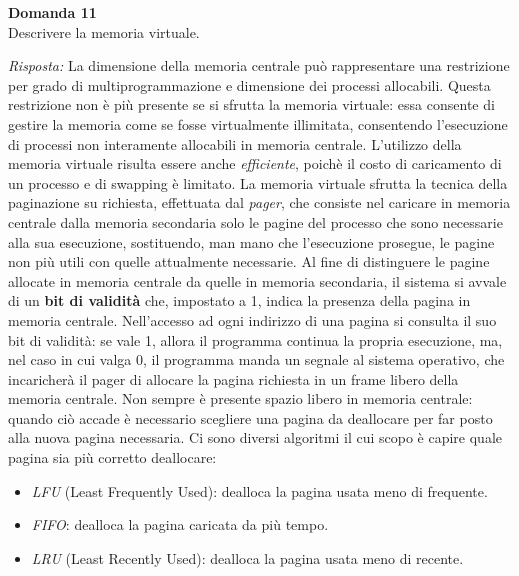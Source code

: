 \documentclass{article}
\newenvironment{problem}[2][Domanda]
    { \begin{mdframed}[backgroundcolor=gray!20] \textbf{#1 #2} \\}
    {  \end{mdframed}}
\newenvironment{solution}
    {\textit{Risposta:}}
    {}
\begin{document}
\begin{problem}{11}
Descrivere la memoria virtuale.
\end{problem}
\begin{solution}
La dimensione della memoria centrale può rappresentare una restrizione per grado di multiprogrammazione e dimensione dei processi allocabili.
Questa restrizione non è più presente se si sfrutta la memoria virtuale: essa consente di gestire la memoria come se fosse virtualmente illimitata, consentendo l’esecuzione di processi non interamente allocabili in memoria centrale.
L’utilizzo della memoria virtuale risulta essere anche \textit{efficiente}, poichè il costo di caricamento di un processo e di swapping è limitato.
\newline
\newline
La memoria virtuale sfrutta la tecnica della paginazione su richiesta, effettuata dal \textit{pager}, che consiste nel caricare in memoria centrale dalla memoria secondaria solo le pagine del processo che sono necessarie alla sua esecuzione, sostituendo, man mano che l’esecuzione prosegue, le pagine non più utili con quelle attualmente necessarie.
\newline
Al fine di distinguere le pagine allocate in memoria centrale da quelle in memoria secondaria, il sistema si avvale di un \textbf{bit di validità} che, impostato a 1, indica la presenza della pagina in memoria centrale.
\newline
Nell’accesso ad ogni indirizzo di una pagina si consulta il suo bit di validità: se vale 1, allora il programma continua la propria esecuzione, ma, nel caso in cui valga 0, il programma manda un segnale al sistema operativo, che incaricherà il pager di allocare la pagina richiesta in un frame libero della memoria centrale.
\newline
Non sempre è presente spazio libero in memoria centrale: quando ciò accade è necessario scegliere una pagina da deallocare per far posto alla nuova pagina necessaria.
\newline
Ci sono diversi algoritmi il cui scopo è capire quale pagina sia più corretto deallocare:
\begin{itemize}
    \item \emph{LFU} (Least Frequently Used): dealloca la pagina usata meno di frequente.
    \item \emph{FIFO}: dealloca la pagina caricata da più tempo.
    \item \emph{LRU} (Least Recently Used): dealloca la pagina usata meno di recente.
\end{itemize}
\end{solution}
\end{document}
